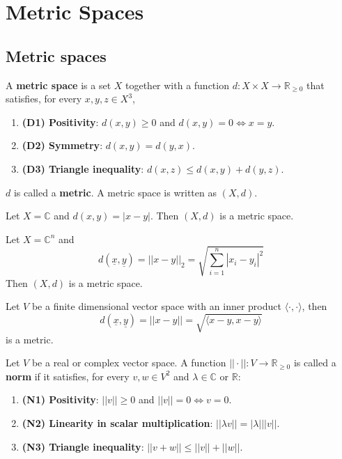 \section{Metric Spaces}

\subsection{Metric spaces}

\begin{definition}
	A \textbf{metric space} is a set $X$ together with a function $d: X \times X \rightarrow \mathbb{R}_{\ge 0}$ that satisfies, for every $x, y, z \in X^3$,
	\begin{enumerate}
		\item \textbf{(D1) Positivity}: $d(x, y) \ge 0$ and $d(x, y) = 0 \Longleftrightarrow x = y$.
		\item \textbf{(D2) Symmetry}: $d(x, y) = d(y, x)$.
		\item \textbf{(D3) Triangle inequality}: $d(x, z) \le d(x, y) + d(y, z)$.
	\end{enumerate}
	$d$ is called a \textbf{metric}. A metric space is written as $(X, d)$.
\end{definition}

\begin{example}
	Let $X = \mathbb{C}$ and $d(x, y) = |x - y|$. Then $(X, d)$ is a metric space.
\end{example}

\begin{example}
	Let $X = \mathbb{C}^n$ and
	\[
		d(\underline{x}, \underline{y}) = ||x - y||_2 = \sqrt{\sum_{i = 1}^n |x_i - y_i|^2}
	\]
	Then $(X, d)$ is a metric space.
\end{example}

\begin{example}
	Let $V$ be a finite dimensional vector space with an inner product $\langle \cdot, \cdot \rangle$, then
	\[
		d(\underline{x}, \underline{y}) = ||x - y|| = \sqrt{\langle x - y, x - y \rangle}
	\]
	is a metric.
\end{example}

\begin{definition}
	Let $V$ be a real or complex vector space. A function $||\cdot||: V \rightarrow \mathbb{R}_{\ge 0}$ is called a \textbf{norm} if it satisfies, for every $v, w \in V^2$ and $\lambda \in \mathbb{C}$ or $\mathbb{R}$:
	\begin{enumerate}
		\item \textbf{(N1) Positivity}: $||v|| \ge 0$ and $||v|| = 0 \Longleftrightarrow v = 0$.
		\item \textbf{(N2) Linearity in scalar multiplication}: $||\lambda v|| = |\lambda| ||v||$.
		\item \textbf{(N3) Triangle inequality}: $||v + w|| \le ||v|| + ||w||$.
	\end{enumerate}
\end{definition}

